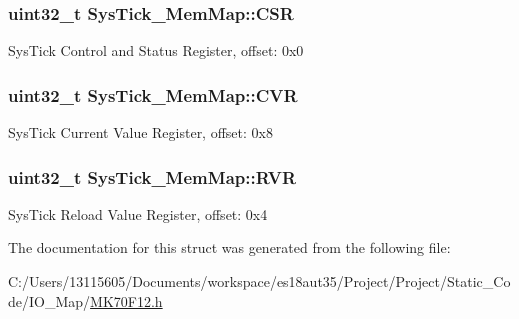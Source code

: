 \subsubsection[{C\+S\+R}]{\setlength{\rightskip}{0pt plus 5cm}uint32\+\_\+t Sys\+Tick\+\_\+\+Mem\+Map\+::\+C\+S\+R}\label{struct_sys_tick___mem_map_aec23689880afd46876916055403e867a}
Sys\+Tick Control and Status Register, offset\+: 0x0 \hypertarget{struct_sys_tick___mem_map_a508dd628bc347f199e7baf4b1bfbfa0d}{}
\subsubsection[{C\+V\+R}]{\setlength{\rightskip}{0pt plus 5cm}uint32\+\_\+t Sys\+Tick\+\_\+\+Mem\+Map\+::\+C\+V\+R}\label{struct_sys_tick___mem_map_a508dd628bc347f199e7baf4b1bfbfa0d}
Sys\+Tick Current Value Register, offset\+: 0x8 \hypertarget{struct_sys_tick___mem_map_a3f2018b492fd4bc1d141a718d499e50f}{}
\subsubsection[{R\+V\+R}]{\setlength{\rightskip}{0pt plus 5cm}uint32\+\_\+t Sys\+Tick\+\_\+\+Mem\+Map\+::\+R\+V\+R}\label{struct_sys_tick___mem_map_a3f2018b492fd4bc1d141a718d499e50f}
Sys\+Tick Reload Value Register, offset\+: 0x4 

The documentation for this struct was generated from the following file\+:\begin{DoxyCompactItemize}
\item 
C\+:/\+Users/13115605/\+Documents/workspace/es18aut35/\+Project/\+Project/\+Static\+\_\+\+Code/\+I\+O\+\_\+\+Map/\hyperlink{_m_k70_f12_8h}{M\+K70\+F12.\+h}\end{DoxyCompactItemize}
